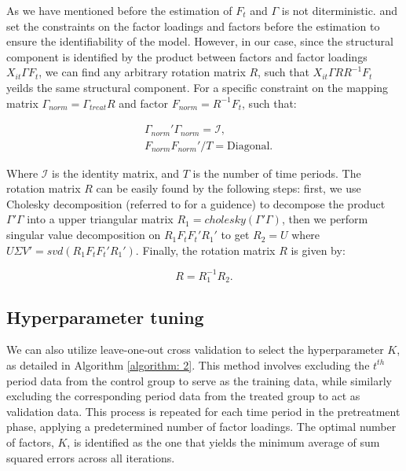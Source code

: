\documentclass[12pt]{article}
\begin{document}
As we have mentioned before the estimation of $F_{t}$ and $\Gamma$ is not diterministic. \cite{bai2009panel} and \cite{xu2017generalized} set the constraints on the factor loadings and factors before the estimation to ensure the identifiability of the model. However, in our case, since the structural component is identified by the product between factors and factor loadings $X_{it}\Gamma F_{t}$, we can find any arbitrary rotation matrix $R$, such that $X_{it}\Gamma R R^{-1}F_{t}$ yeilds the same structural component. For a specific constraint on the mapping matrix $\Gamma_{norm} = \Gamma_{treat}R$ and factor $F_{norm} = R^{-1}F_t$, such that:

\begin{equation}
\begin{aligned}
& \Gamma_{norm}'\Gamma_{norm} = \mathcal{I}, \\
& F_{norm} F_{norm}'/T = \text{Diagonal}.
\end{aligned}
\end{equation}

\noindent Where $\mathcal{I}$ is the identity matrix, and $T$ is the number of time periods. The rotation matrix $R$ can be easily found by the following steps: first, we use Cholesky decomposition (referred to \cite{higham2009cholesky} for a guidence) to decompose the product $\Gamma' \Gamma$ into a upper triangular matrix $R_1 = cholesky(\Gamma' \Gamma)$, then we perform singular value decomposition on $R_1F_tF_t'R_1'$ to get $R_2 = U$ where $U\Sigma V'=svd(R_1F_tF_t'R_1')$. Finally, the rotation matrix $R$ is given by:

\begin{equation}
R = R_1^{-1}R_2.
\end{equation}

\subsection{Hyperparameter tuning}
\label{sec: appendix hyperparameter}
We can also utilize leave-one-out cross validation to select the hyperparameter $K$, as detailed in Algorithm \ref{algorithm: 2}. This method involves excluding the $t^{th}$ period data from the control group to serve as the training data, while similarly excluding the corresponding period data from the treated group to act as validation data. This process is repeated for each time period in the pretreatment phase, applying a predetermined number of factor loadings. The optimal number of factors, $K$, is identified as the one that yields the minimum average of sum squared errors across all iterations.
\end{document}
